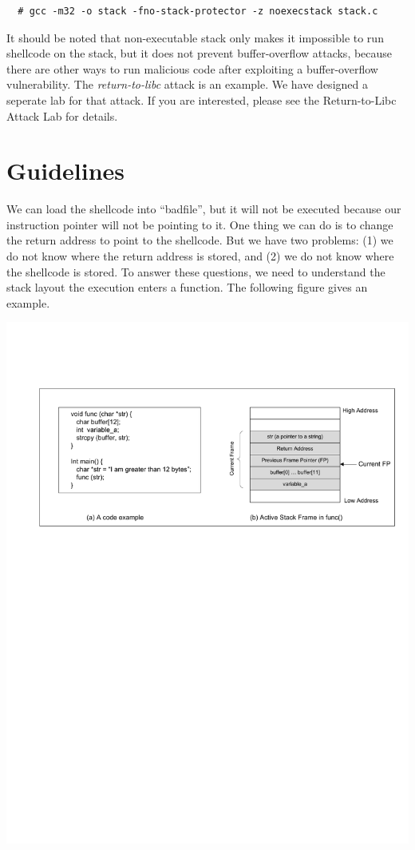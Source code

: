 \begin{verbatim}
  # gcc -m32 -o stack -fno-stack-protector -z noexecstack stack.c
\end{verbatim}


It should be noted that non-executable stack only makes it impossible to run shellcode 
on the stack, but it does not prevent buffer-overflow attacks, 
because there are other ways to run malicious code after exploiting 
a buffer-overflow vulnerability. The {\em return-to-libc} attack
is an example. We have designed a seperate lab for that 
attack. If you are interested, please see the 
Return-to-Libc Attack Lab for details.



\section{Guidelines}

We can load the shellcode into ``badfile'', but it will not be executed because our
instruction pointer will not be pointing to it. One thing we can do is to change
the return address to point to the shellcode. But we have two problems:
(1) we do not know where the return address is stored, and
(2) we do not know where the shellcode is stored.
To answer these questions, we need to understand the stack layout the 
execution enters a function. The following figure gives 
an example.


\hspace{-0.5in}
\includegraphics*[viewport=40 480 595 700,width=6.5in]{Figs/buffer_overflow_stack_example1.pdf}


